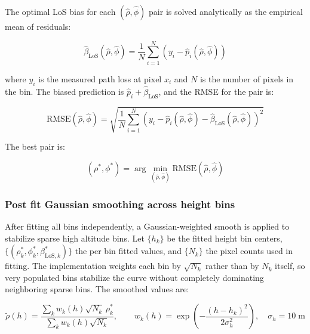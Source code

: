 The optimal LoS bias for each $(\hat\rho, \hat\phi)$ pair is solved analytically
as the empirical mean of residuals:

\begin{equation}
\widehat{\beta}_{\mathrm{LoS}}(\hat\rho, \hat\phi)
=
\frac{1}{N}\sum_{i=1}^{N}
\left(y_i - \hat p_i(\hat\rho, \hat\phi)\right)
\end{equation}

where $y_i$ is the measured path loss at pixel $x_i$ and $N$ is the number
of pixels in the bin. The biased prediction is
\(\hat p_i + \widehat{\beta}_{\mathrm{LoS}}\), and the
RMSE for the pair is:

\begin{equation}
\mathrm{RMSE}(\hat\rho, \hat\phi)
=
\sqrt{\frac{1}{N}\sum_{i=1}^{N}
\left(y_i - \hat p_i(\hat\rho,\hat\phi) -
\widehat{\beta}_{\mathrm{LoS}}(\hat\rho,\hat\phi)\right)^2}
\label{eq:rmse_grid}
\end{equation}

The best pair is:

\begin{equation}
(\rho^*, \phi^*)
= \arg\min_{(\hat\rho, \hat\phi)}
\mathrm{RMSE}(\hat\rho, \hat\phi)
\end{equation}

\subsubsection{Post fit Gaussian smoothing across height bins}

After fitting all bins independently, a Gaussian-weighted smooth is applied
to stabilize sparse high altitude bins. Let $\{h_k\}$ be the fitted height
bin centers, \(\{(\rho_k^*, \phi_k^*, \beta_{\mathrm{LoS},k}^*)\}\) the per bin fitted values,
and $\{N_k\}$ the pixel counts used in fitting. The implementation weights
each bin by $\sqrt{N_k}$ rather than by $N_k$ itself, so very populated bins
stabilize the curve without completely dominating neighboring sparse bins.
The smoothed values are:

\begin{equation}
\tilde\rho(h)
=
\frac{\sum_k w_k(h)\sqrt{N_k}\,\rho_k^*}{\sum_k w_k(h)\sqrt{N_k}},
\qquad
w_k(h) = \exp\!\left(-\frac{(h - h_k)^2}{2\sigma_h^2}\right),
\quad \sigma_h = 10\;\mathrm{m}
\label{eq:gauss_smooth}
\end{equation}

